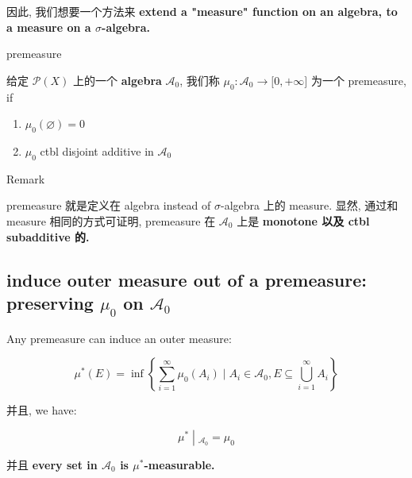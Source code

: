 \documentclass{qlnotes-export}
\begin{document}
因此, 我们想要一个方法来 \textbf{extend a "measure" function on an algebra, to a measure on a \(\sigma\)-algebra.}

\begin{definition}{premeasure}\label{def-02-outer-measure-completion-of-a-measurable-space-premeasure}

给定 \(\mathcal{P}(X)\) 上的一个 \textbf{algebra} \(\mathcal{A}_{0}\), 我们称 \(\mu_{0}:\mathcal{A}_{0}\rightarrow\lbrack 0, + \infty\rbrack\) 为一个 premeasure, if

\begin{enumerate}
\item
  \(\mu_{0}(\varnothing) = 0\)
\item
  \(\mu_{0}\) ctbl disjoint additive in \(\mathcal{A}_{0}\)
\end{enumerate}

\end{definition}

\begin{qlremark}{Remark}

premeasure 就是定义在 algebra instead of \(\sigma\)-algebra 上的 measure. 显然, 通过和 measure 相同的方式可证明, premeasure 在 \(\mathcal{A}_{0}\) 上是 \textbf{monotone 以及 ctbl subadditive 的.}

\end{qlremark}

\subsection{\texorpdfstring{induce outer measure out of a premeasure: preserving \(\mu_{0}\) on \(\mathcal{A}_{0}\)}{induce outer measure out of a premeasure: preserving \textbackslash mu\_\{0\} on \textbackslash mathcal\{A\}\_\{0\}}}\label{induce-outer-measure-out-of-a-premeasure-preserving-mu_0-on-mathcala_0}

\begin{proposition}\label{prop-02-outer-measure-completion-of-a-measurable-space-proposition-001}

Any premeasure can induce an outer measure:

\[\mu^{\ast}(E) = \inf\left\{ {\sum\limits_{i = 1}^{\infty}\mu_{0}(A_{i}) \mid A_{i} \in \mathcal{A}_{0},E \subseteq \bigcup\limits_{i = 1}^{\infty}A_{i}} \right\}\]

并且, we have:

\[\left. \mu^{\ast} \middle| {}_{\mathcal{A}_{0}} = \mu_{0} \right.\]

并且 \textbf{every set in \(\mathcal{A}_{0}\) is \(\mu^{\ast}\)-measurable.}

\end{proposition}
\end{document}
